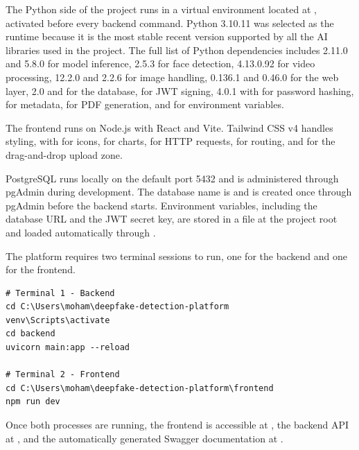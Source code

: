 The Python side of the project runs in a virtual environment located at , activated before every backend command. Python 3.10.11 was selected as the runtime because it is the most stable recent version supported by all the AI libraries used in the project. The full list of Python dependencies includes  2.11.0 and  5.8.0 for model inference,  2.5.3 for face detection,  4.13.0.92 for video processing,  12.2.0 and  2.2.6 for image handling,  0.136.1 and  0.46.0 for the web layer,  2.0 and  for the database,  for JWT signing,  4.0.1 with  for password hashing,  for metadata,  for PDF generation, and  for environment variables.

The frontend runs on Node.js with React and Vite. Tailwind CSS v4 handles styling, with  for icons,  for charts,  for HTTP requests,  for routing, and  for the drag-and-drop upload zone.

PostgreSQL runs locally on the default port 5432 and is administered through pgAdmin during development. The database name is  and is created once through pgAdmin before the backend starts. Environment variables, including the database URL and the JWT secret key, are stored in a  file at the project root and loaded automatically through .

The platform requires two terminal sessions to run, one for the backend and one for the frontend.

\begin{verbatim}
# Terminal 1 - Backend
cd C:\Users\moham\deepfake-detection-platform
venv\Scripts\activate
cd backend
uvicorn main:app --reload

# Terminal 2 - Frontend
cd C:\Users\moham\deepfake-detection-platform\frontend
npm run dev
\end{verbatim}

Once both processes are running, the frontend is accessible at , the backend API at , and the automatically generated Swagger documentation at .

